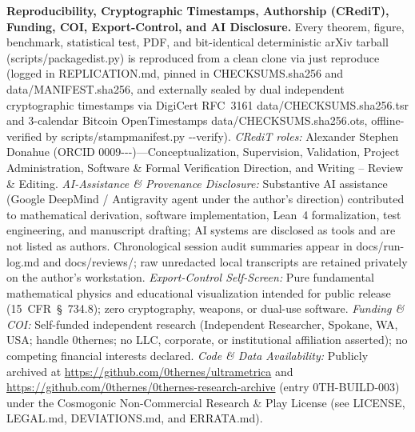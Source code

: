 \documentclass[11pt,a4paper]{article}
\numberwithin{equation}{section}
\theoremstyle{plain}
\theoremstyle{definition}
\theoremstyle{remark}
\newcommand{\code}[1]{{\ttfamily\footnotesize\def\_{\textunderscore\penalty0\hskip0pt}#1}}
\begin{document}
\newpage
\textbf{Reproducibility, Cryptographic Timestamps, Authorship (CRediT), Funding, COI, Export-Control, and AI Disclosure.} Every theorem, figure, benchmark, statistical test, PDF, and bit-identical deterministic arXiv tarball (\code{scripts/package\_dist.py}) is reproduced from a clean clone via \code{just reproduce} (logged in \code{REPLICATION.md}, pinned in \code{CHECKSUMS.\allowbreak sha256} and \code{data/\allowbreak MANIFEST.\allowbreak sha256}, and externally sealed by dual independent cryptographic timestamps via DigiCert RFC~3161 \code{data/CHECKSUMS.sha256.tsr} and 3-calendar Bitcoin OpenTimestamps \code{data/CHECKSUMS.sha256.ots}, offline-verified by \code{scripts/stamp\_manifest.py {-}{-}verify}). \emph{CRediT roles:} Alexander Stephen Donahue (ORCID \code{0009---})---Conceptualization, Supervision, Validation, Project Administration, Software \& Formal Verification Direction, and Writing -- Review \& Editing. \emph{AI-Assistance \& Provenance Disclosure:} Substantive AI assistance (Google DeepMind / Antigravity agent under the author's direction) contributed to mathematical derivation, software implementation, Lean~4 formalization, test engineering, and manuscript drafting; AI systems are disclosed as tools and are not listed as authors. Chronological session audit summaries appear in \code{docs/\allowbreak run-log.\allowbreak md} and \code{docs/\allowbreak reviews/}; raw unredacted local transcripts are retained privately on the author's workstation. \emph{Export-Control Self-Screen:} Pure fundamental mathematical physics and educational visualization intended for public release (15~CFR~\S~734.8); zero cryptography, weapons, or dual-use software. \emph{Funding \& COI:} Self-funded independent research (Independent Researcher, Spokane, WA, USA; handle \code{0thernes}; no LLC, corporate, or institutional affiliation asserted); no competing financial interests declared. \emph{Code \& Data Availability:} Publicly archived at \url{https://github.com/0thernes/ultrametrica} and \url{https://github.com/0thernes/0thernes-research-archive} (entry \code{0TH-BUILD-003}) under the Cosmogonic Non-Commercial Research \& Play License (see \code{LICENSE}, \code{LEGAL.md}, \code{DEVIATIONS.md}, and \code{ERRATA.md}).

\clearpage


\end{document}
